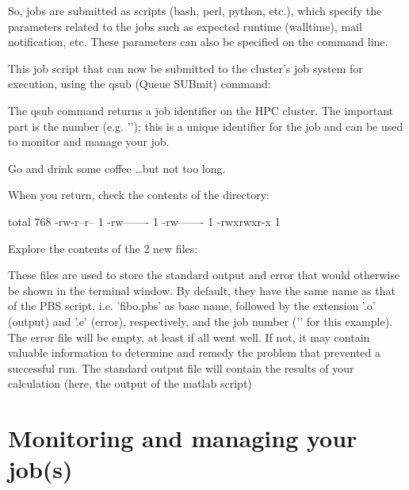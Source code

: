 So, jobs are submitted as scripts (bash, perl, python, etc.), which specify the
parameters related to the jobs such as expected runtime (walltime), mail
notification, etc. These parameters can also be specified on the command line.

This job script that can now be submitted to the cluster's job system for
execution, using the qsub (Queue SUBmit) command:

\begin{prompt}
\end{prompt}

The qsub command returns a job identifier on the HPC cluster. The important
part is the number (e.g. '\jobnumber'); this is a unique identifier for the job
and can be used to monitor and manage your job.

Go and drink some coffee \dots but not too long.

When you return, check the contents of the directory:

\begin{prompt}
total 768
-rw-r--r-- 1 %
-rw------- 1 %
-rw------- 1 %
-rwxrwxr-x 1 %
\end{prompt}

Explore the contents of the 2 new files:

\begin{prompt}
\end{prompt}

These files are used to store the standard output and error that would
otherwise be shown in the terminal window. By default, they have the same name
as that of the PBS script, i.e. 'fibo.pbs' as base name, followed by the
extension '.o' (output) and '.e' (error), respectively, and the job number
('\jobnumber' for this example). The error file will be empty, at least if all went
well. If not, it may contain valuable information to determine and remedy the
problem that prevented a successful run. The standard output file will contain
the results of your calculation (here, the output of the matlab script)

\section{Monitoring and managing your job(s)}


